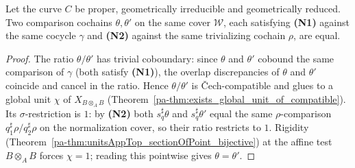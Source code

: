 \begin{theorem}
  \label{pa-thm:normalizedComparison_unique}
  \leanok

  Let the curve \(C\) be proper, geometrically irreducible and geometrically reduced. Two comparison
  cochains \(\theta, \theta'\) on the same cover \(\mathcal W\), each satisfying \textbf{(N1)}
  against the same cocycle \(\gamma\) and \textbf{(N2)} against the same trivializing cochain
  \(\rho\), are equal.
\end{theorem}
\begin{proof}
  \leanok
  The ratio \(\theta/\theta'\) has trivial coboundary: since \(\theta\) and \(\theta'\) cobound the
  same comparison of \(\gamma\) (both satisfy \textbf{(N1)}), the overlap discrepancies of
  \(\theta\) and \(\theta'\) coincide and cancel in the ratio. Hence \(\theta/\theta'\) is \v
  Cech-compatible and glues to a global unit \(\chi\) of \(X_{B \otimes_A B}\)
  (Theorem~\ref{pa-thm:exists_global_unit_of_compatible}). Its \(\sigma\)-restriction is \(1\): by
  \textbf{(N2)} both \(s_q^{\sharp}\theta\) and \(s_q^{\sharp}\theta'\) equal the same
  \(\rho\)-comparison \(q_1^{\sharp}\rho / q_2^{\sharp}\rho\) on the normalization cover, so their
  ratio restricts to \(1\). Rigidity (Theorem~\ref{pa-thm:unitsAppTop_sectionOfPoint_bijective}) at the
  affine test \(B \otimes_A B\) forces \(\chi = 1\); reading this pointwise gives \(\theta =
  \theta'\).
\end{proof}


